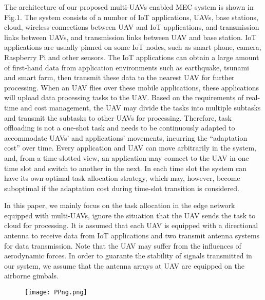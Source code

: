 \documentclass[journal,article,submit,pdftex,moreauthors]{Definitions/mdpi}
\begin{document}
 The architecture of our proposed multi-UAVs enabled MEC system is shown in Fig.1. The system consists of a number of IoT applications, UAVs, base stations, cloud, wireless connections between UAV and IoT applications, and transmission links between UAVs, and transmission links between UAV and base station. IoT applications are usually pinned on some IoT nodes, such as smart phone, camera, Raspberry Pi and other sensors. The IoT applications can obtain a large amount of first-hand data from application environments such as earthquake, tsunami and smart farm, then transmit these data to the nearest UAV for further processing. When an UAV flies over these mobile applications, these applications will upload data processing tasks to the UAV. Based on the requirements of real-time and  cost management, the UAV may  divide the tasks into multiple subtasks and transmit the subtasks to other UAVs for processing. Therefore,  task offloading  is not a one-shot task and needs to be continuously adapted to accommodate UAVs' and applications' movements, incurring the “adaptation cost” over time. Every application and UAV can move arbitrarily in the system, and, from a time-slotted view, an application may connect to the UAV in one time slot and switch to another in the next. In each time slot the system can have its own optimal task allocation strategy, which may, however, become suboptimal if the adaptation cost during time-slot transition is considered. 

In this paper, we mainly focus on the task allocation in the edge network equipped with multi-UAVs, ignore the situation that the UAV sends the task to cloud for processing. It is assumed that each UAV is equipped with a directional  antenna to receive data from IoT applications and two transmit antenna systems for data transmission. Note that the UAV may suffer from the influences of aerodynamic forces. In order to guarante  the stability of signals transmitted in our system, we assume that the antenna arrays at UAV  are equipped on the airborne gimbals\cite{RuiHan2020}.


     
\begin{figure}[H]
\centering
\texttt{[image: PPng.png]} 

 \centering
\fontsize{6.5}{8}
\end{figure}
\end{document}

